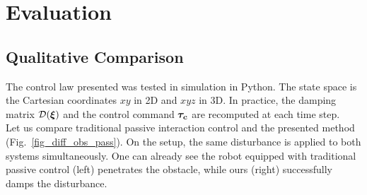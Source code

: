 
\section{Evaluation}  \label{sec:evaluation}

\subsection{Qualitative Comparison} \label{sec:qual_comp}
The control law presented was tested in simulation in Python. The state space is the Cartesian coordinates $xy$ in 2D and $xyz$ in 3D. In practice, the damping matrix $\mathcal{D}(\boldsymbol{\xi})$ and the control command $\boldsymbol{\tau_c}$ are recomputed at each time step.\\

Let us compare traditional passive interaction control and the presented method (Fig.~\ref{fig_diff_obs_pass}). On the setup, the same disturbance is applied to both systems simultaneously. One can already see the robot equipped with traditional passive control (left) penetrates the obstacle, while ours (right) successfully damps the disturbance.


